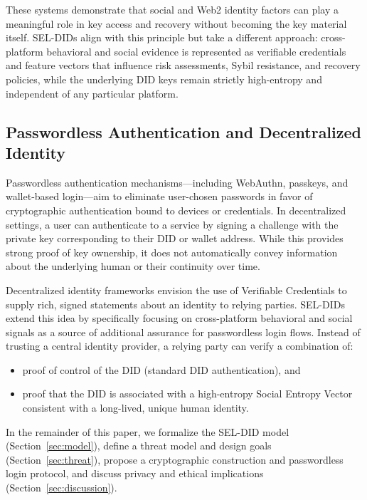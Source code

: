 \documentclass[11pt]{article}
\begin{document}
These systems demonstrate that social and Web2 identity factors can play a meaningful role in key access and recovery without becoming the key material itself. SEL-DIDs align with this principle but take a different approach: cross-platform behavioral and social evidence is represented as verifiable credentials and feature vectors that influence risk assessments, Sybil resistance, and recovery policies, while the underlying DID keys remain strictly high-entropy and independent of any particular platform.

\subsection{Passwordless Authentication and Decentralized Identity}

Passwordless authentication mechanisms---including WebAuthn, passkeys, and wallet-based login---aim to eliminate user-chosen passwords in favor of cryptographic authentication bound to devices or credentials. In decentralized settings, a user can authenticate to a service by signing a challenge with the private key corresponding to their DID or wallet address. While this provides strong proof of key ownership, it does not automatically convey information about the underlying human or their continuity over time.

Decentralized identity frameworks envision the use of Verifiable Credentials to supply rich, signed statements about an identity to relying parties. SEL-DIDs extend this idea by specifically focusing on cross-platform behavioral and social signals as a source of additional assurance for passwordless login flows. Instead of trusting a central identity provider, a relying party can verify a combination of:

\begin{itemize}
  \item proof of control of the DID (standard DID authentication), and
  \item proof that the DID is associated with a high-entropy Social Entropy Vector consistent with a long-lived, unique human identity.
\end{itemize}

In the remainder of this paper, we formalize the SEL-DID model (Section~\ref{sec:model}), define a threat model and design goals (Section~\ref{sec:threat}), propose a cryptographic construction and passwordless login protocol, and discuss privacy and ethical implications (Section~\ref{sec:discussion}).
\end{document}
